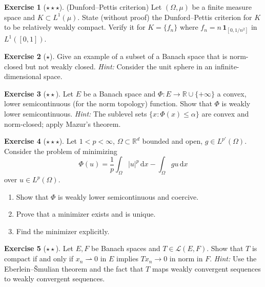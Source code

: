 \documentclass[a4paper,12pt]{book}
\newcommand{\R}{\mathbb{R}}
\newcommand{\dd}{\mathrm{d}}
\newcommand{\weakto}{\rightharpoonup}
\theoremstyle{definition}
\newtheorem{exercise}{Exercise}[chapter]
\theoremstyle{plain}
\theoremstyle{remark}
\begin{document}
\begin{exercise}[$\star\star\star$]\label{exo:dunford-pettis}
(Dunford--Pettis criterion) Let $(\Omega,\mu)$ be a finite measure space and
$K\subset L^1(\mu)$.  State (without proof) the Dunford--Pettis criterion for
$K$ to be relatively weakly compact.  Verify it for $K = \{f_n\}$ where
$f_n = n\,\mathbf{1}_{[0,1/n^2]}$ in $L^1([0,1])$.
\end{exercise}

\begin{exercise}[$\star$]\label{exo:weak-vs-norm-closed}
Give an example of a subset of a Banach space that is norm-closed but not
weakly closed.
\textit{Hint:} Consider the unit sphere in an infinite-dimensional space.
\end{exercise}

\begin{exercise}[$\star\star$]\label{exo:weak-lower-semicontinuous-convex}
Let $E$ be a Banach space and $\Phi:E\to\R\cup\{+\infty\}$ a convex,
lower semicontinuous (for the norm topology) function.  Show that $\Phi$ is
weakly lower semicontinuous.
\textit{Hint:} The sublevel sets $\{x:\Phi(x)\le\alpha\}$ are convex and
norm-closed; apply Mazur's theorem.
\end{exercise}

\begin{exercise}[$\star\star\star$]\label{exo:minimizer-Lp}
Let $1<p<\infty$, $\Omega\subset\R^d$ bounded and open, $g\in L^{p'}(\Omega)$.
Consider the problem of minimizing
\[
  \Phi(u) = \frac{1}{p}\int_\Omega |u|^p\,\dd x - \int_\Omega gu\,\dd x
\]
over $u\in L^p(\Omega)$.
\begin{enumerate}[label=(\alph*)]
  \item Show that $\Phi$ is weakly lower semicontinuous and coercive.
  \item Prove that a minimizer exists and is unique.
  \item Find the minimizer explicitly.
\end{enumerate}
\end{exercise}

\begin{exercise}[$\star\star$]\label{exo:weak-compact-operators}
Let $E,F$ be Banach spaces and $T\in\mathcal{L}(E,F)$.  Show that $T$ is
compact if and only if $x_n\weakto 0$ in $E$ implies $Tx_n\to 0$ in norm
in $F$.
\textit{Hint:} Use the Eberlein--\v{S}mulian theorem and the fact that
$T$ maps weakly convergent sequences to weakly convergent sequences.
\end{exercise}
\end{document}
